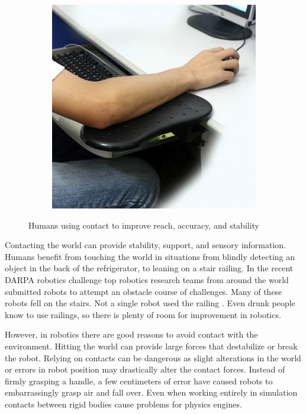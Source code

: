 \documentclass[../thesis.tex]{subfiles}
\begin{document}
\begin{figure}
\begin{subfigure}[b]{0.3\linewidth}
    \includegraphics[width=\linewidth]{./Introduction/mouse.jpg}    
  \end{subfigure}
  \label{fig:HumanContact}
  \caption{Humans using contact to improve reach, accuracy, and stability}    
\end{figure}



Contacting the world can provide stability, support, and sensory information.
Humans benefit from touching the world in situations from blindly detecting an object in the back of the refrigerator, to leaning on a stair railing. 
In the recent DARPA robotics challenge top robotics research teams from around the world submitted robots to attempt an obstacle course of challenges.
Many of these robots fell on the stairs. 
Not a single robot used the railing \cite{Atkeson2015}.
Even drunk people know to use railings, so there is plenty of room for improvement in robotics.

However, in robotics there are good reasons to avoid contact with the environment.
Hitting the world can provide large forces that destabilize or break the robot.
Relying on contacts can be dangerous as slight alterations in the world or errors in robot position may drastically alter the contact forces.
Instead of firmly grasping a handle, a few centimeters of error have caused robots to embarrassingly grasp air and fall over.
Even when working entirely in simulation contacts between rigid bodies cause problems for physics engines.
\end{document}
